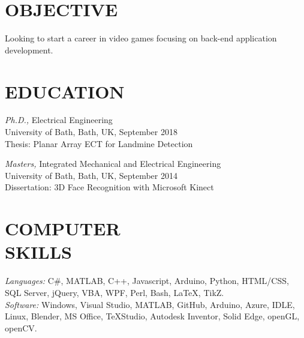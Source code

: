 \documentclass[margin, 10pt]{res} %
\begin{document}
\begin{resume}
\section{OBJECTIVE}  
Looking to start a career in video games focusing on back-end application development.
\section{EDUCATION}

{\sl Ph.D.,} Electrical Engineering \\
University of Bath, Bath, UK, September 2018 \\
Thesis: Planar Array ECT for Landmine Detection

{\sl Masters,} Integrated Mechanical and Electrical Engineering \\
University of Bath, Bath, UK, September 2014 \\
Dissertation: 3D Face Recognition with Microsoft Kinect
 

\section{COMPUTER \\ SKILLS} 

{\sl Languages:} 
C\#, MATLAB, C++, Javascript, Arduino, Python, HTML/CSS, SQL Server, jQuery, VBA, WPF, Perl, Bash, LaTeX, TikZ. \\
{\sl Software:} Windows, Visual Studio, MATLAB, GitHub, Arduino, Azure, IDLE, Linux, Blender, MS Office, TeXStudio, Autodesk Inventor, Solid Edge, openGL, openCV. 
 
 

\end{resume}
\end{document}

